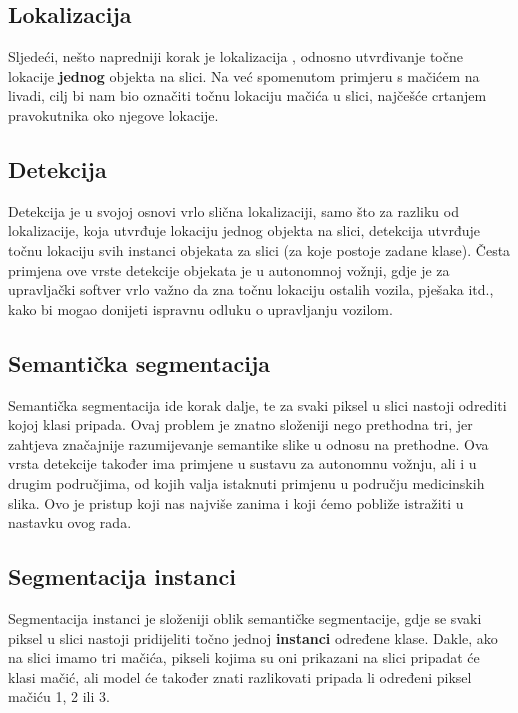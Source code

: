 \subsection{Lokalizacija}
Sljedeći, nešto napredniji korak je lokalizacija , odnosno utvrđivanje točne lokacije \textbf{jednog} objekta na slici. Na već spomenutom primjeru s mačićem na livadi, cilj bi nam bio označiti točnu lokaciju mačića u slici, najčešće crtanjem pravokutnika oko njegove lokacije.

\subsection{Detekcija}
Detekcija  je u svojoj osnovi vrlo slična lokalizaciji, samo što za razliku od lokalizacije, koja utvrđuje lokaciju jednog objekta na slici, detekcija utvrđuje točnu lokaciju svih instanci objekata za slici (za koje postoje zadane klase).  Česta primjena ove vrste detekcije objekata je u autonomnoj vožnji, gdje je za upravljački softver vrlo važno da zna točnu lokaciju ostalih vozila, pješaka itd., kako bi mogao donijeti ispravnu odluku o upravljanju vozilom.

\subsection{Semantička segmentacija}
Semantička segmentacija  ide korak dalje, te za svaki piksel u slici nastoji odrediti kojoj klasi pripada. Ovaj problem je znatno složeniji nego prethodna tri, jer zahtjeva značajnije razumijevanje semantike slike u odnosu na prethodne. Ova vrsta detekcije također ima primjene u sustavu za autonomnu vožnju, ali i u drugim područjima, od kojih valja istaknuti primjenu u području medicinskih slika. Ovo je pristup koji nas najviše zanima i koji ćemo pobliže istražiti u nastavku ovog rada.

\subsection{Segmentacija instanci }
Segmentacija instanci  je složeniji oblik semantičke segmentacije, gdje se svaki piksel u slici nastoji pridijeliti točno jednoj \textbf{instanci} određene klase. Dakle, ako na slici imamo tri mačića, pikseli kojima su oni prikazani na slici pripadat će klasi mačić, ali model će također znati razlikovati pripada li određeni piksel mačiću 1, 2 ili 3.



